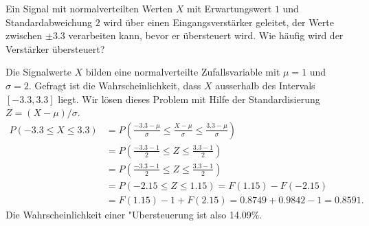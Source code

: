 Ein Signal mit normalverteilten Werten $X$ mit Erwartungswert
$1$ und Standardabweichung $2$ wird über einen Eingangsverstärker
geleitet, der Werte zwischen $\pm3.3$ verarbeiten kann, bevor
er übersteuert wird. Wie häufig wird der Verstärker übersteuert?


\begin{loesung}
Die Signalwerte $X$ bilden eine normalverteilte Zufallsvariable mit $\mu = 1$
und $\sigma=2$. Gefragt ist die Wahrscheinlichkeit, dass
$X$ ausserhalb des Intervals $[-3.3, 3.3]$ liegt. Wir lösen dieses
Problem mit Hilfe der Standardisierung $Z=(X-\mu)/\sigma$.
\begin{align*}
P(-3.3\le X\le 3.3)
&=
P\left(
\frac{-3.3-\mu }{\sigma}
\le
\frac{X-\mu}{\sigma}
\le
\frac{3.3-\mu }{\sigma}
\right)
\\
&=
P\left(
\frac{-3.3-1}{2}
\le
Z
\le
\frac{3.3-1}{2}
\right)
\\
&=
P\left(
\frac{-3.3-1}{2}
\le
Z
\le
\frac{3.3-1}{2}
\right)
\\
&=P(-2.15 \le Z \le 1.15)
=F(1.15)-F(-2.15)\\
&=F(1.15)-1+F(2.15)
=0.8749+0.9842 - 1=0.8591.
\end{align*}
Die Wahrscheinlichkeit einer "Ubersteuerung ist also 14.09\%.
\end{loesung}

